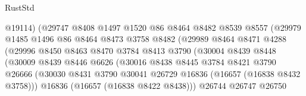 \begin{lexlean}{RustStd}
\begin{coremodule}
                                  @19114)
                                (@29747
                                  @8408
                                  @1497
                                  @1520
                                  @86
                                  @8464
                                  @8482
                                  @8539
                                  @8557
                                  (@29979
                                    @1485
                                    @1496
                                    @86
                                    @8464
                                    @8473
                                    @3758
                                    @8482
                                    (@29989
                                      @8464
                                      @8471
                                      @4288
                                      (@29996
                                        @8450
                                        @8463
                                        @8470
                                        @3784
                                        @8413
                                        @3790
                                        (@30004
                                          @8439
                                          @8448
                                          (@30009
                                            @8439
                                            @8446
                                            @6626
                                            (@30016
                                              @8438
                                              @8445
                                              @3784
                                              @8421
                                              @3790
                                              @26666
                                              (@30030
                                                @8431
                                                @3790
                                                @30041
                                                @26729
                                                @16836
                                                (@16657 (@16838 @8432 @3758)))
                                              @16836
                                              (@16657 (@16838 @8422 @8438)))
                                            @26744
                                            @26747
                                            @26750

\end{coremodule}
\end{lexlean}
